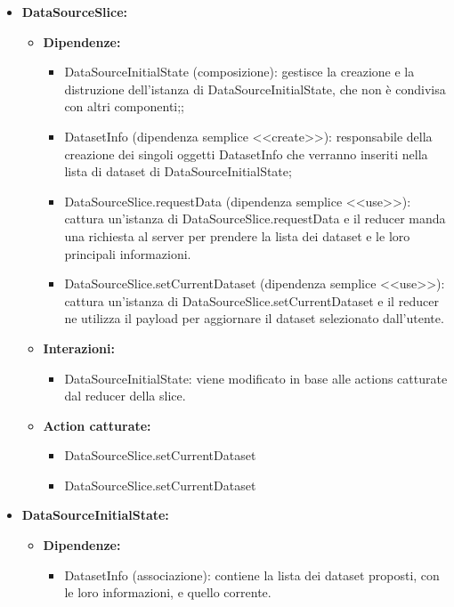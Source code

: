 \begin{itemize}
    \item \textbf{DataSourceSlice:}
    \begin{itemize}
        \item \textbf{Dipendenze:}
        \begin{itemize}
            \item DataSourceInitialState (composizione): gestisce la creazione e la distruzione dell'istanza di DataSourceInitialState, che non è condivisa con altri componenti;;
            \item DatasetInfo (dipendenza semplice <<create>>):  responsabile della creazione dei singoli oggetti DatasetInfo che verranno inseriti nella lista di dataset di DataSourceInitialState;
            \item DataSourceSlice.requestData (dipendenza semplice <<use>>): cattura un'istanza di DataSourceSlice.requestData e il reducer manda una richiesta al server per prendere la lista dei dataset e le loro principali informazioni.
            \item DataSourceSlice.setCurrentDataset (dipendenza semplice <<use>>): cattura un'istanza di DataSourceSlice.setCurrentDataset e il reducer ne utilizza il payload per aggiornare il dataset selezionato dall'utente.
        \end{itemize} 
        \item \textbf{Interazioni:}
        \begin{itemize}
            \item DataSourceInitialState: viene modificato in base alle actions catturate dal reducer della slice.
        \end{itemize} 
        \item \textbf{Action catturate:}
        \begin{itemize}
            \item DataSourceSlice.setCurrentDataset
            \item DataSourceSlice.setCurrentDataset
        \end{itemize} 
    \end{itemize}

    
    \item \textbf{DataSourceInitialState:}
    \begin{itemize}
        \item \textbf{Dipendenze:}
        \begin{itemize}
            \item DatasetInfo (associazione): contiene la lista dei dataset proposti, con le loro informazioni, e quello corrente.
        \end{itemize} 
    \end{itemize}


\end{itemize}
